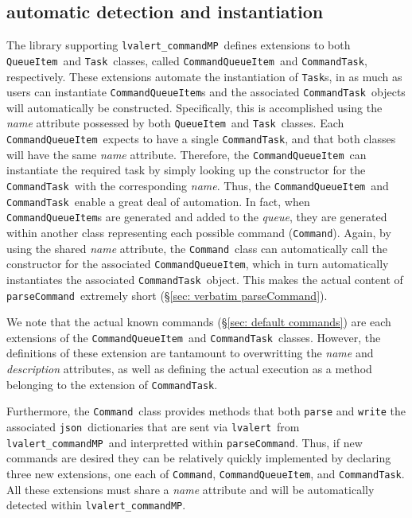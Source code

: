 \documentclass{article}
\newcommand{\alert}{\texttt{lvalert}}
\newcommand{\lvalertCommandMP}{\texttt{lvalert\_commandMP}}
\newcommand{\parseCommand}{\texttt{parseCommand}}
\newcommand{\QueueItem}{\texttt{QueueItem}}
\newcommand{\Task}{\texttt{Task}}
\newcommand{\Command}{\texttt{Command}}
\newcommand{\CommandQueueItem}{\texttt{CommandQueueItem}}
\newcommand{\CommandTask}{\texttt{CommandTask}}
\newcommand{\json}{\texttt{json}}
\begin{document}

\subsection{automatic detection and instantiation}
\label{sec: automatic detection and instantiation}

The library supporting \lvalertCommandMP~defines extensions to both \QueueItem~and \Task~classes, called \CommandQueueItem~and \CommandTask, respectively.
These extensions automate the instantiation of {\Task}s, in as much as users can instantiate {\CommandQueueItem}s and the associated \CommandTask~objects will automatically be constructed.
Specifically, this is accomplished using the \textit{name} attribute possessed by both \QueueItem~and \Task~classes.
Each \CommandQueueItem~expects to have a single \CommandTask, and that both classes will have the same \textit{name} attribute. 
Therefore, the \CommandQueueItem~can instantiate the required task by simply looking up the constructor for the \CommandTask~with the corresponding \textit{name}.
Thus, the \CommandQueueItem~and \CommandTask~enable a great deal of automation. 
In fact, when {\CommandQueueItem}s are generated and added to the \textit{queue}, they are generated within another class representing each possible command (\Command).
Again, by using the shared \textit{name} attribute, the \Command~class can automatically call the constructor for the associated \CommandQueueItem, which in turn automatically instantiates the associated \CommandTask~object.
This makes the actual content of \parseCommand~extremely short (\S\ref{sec: verbatim parseCommand}).

We note that the actual known commands (\S\ref{sec: default commands}) are each extensions of the \CommandQueueItem~and \CommandTask~classes.
However, the definitions of these extension are tantamount to overwritting the \textit{name} and \textit{description} attributes, as well as defining the actual execution as a method belonging to the extension of \CommandTask.

Furthermore, the \Command~class provides methods that both \texttt{parse} and \texttt{write} the associated \json~dictionaries that are sent via \alert~from \lvalertCommandMP~and interpretted within \parseCommand.
Thus, if new commands are desired they can be relatively quickly implemented by declaring three new extensions, one each of \Command, \CommandQueueItem, and \CommandTask.
All these extensions must share a \textit{name} attribute and will be automatically detected within \lvalertCommandMP.
\end{document}
